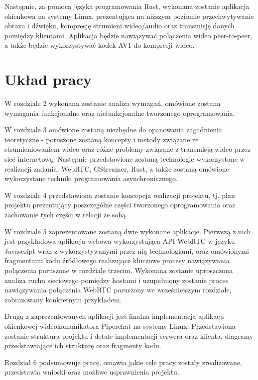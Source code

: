 Następnie, za pomocą języka programowania Rust, wykonana zostanie aplikacja okienkowa na systemy
Linux, prezentująca na niższym poziomie przechwytywanie obrazu i dźwięku, kompresję strumieni
wideo/audio oraz transmisję danych pomiędzy klientami. Aplikacja będzie nawiązywać połączenia wideo
peer-to-peer, a także będzie wykorzystywać kodek AV1 do kompresji wideo.

\section{Układ pracy}

W rozdziale 2 wykonana zostanie analiza wymagań, omówione zostaną wymagania funkcjonalne oraz
niefunkcjonalne tworzonego oprogramowania.

W rozdziale 3 omówione zostaną niezbędne do opanowania zagadnienia teoretyczne - poruszone zostaną
koncepty i metody związane ze strumieniowaniem wideo oraz różne problemy związane z transmisją wideo
przez sieć internetową.
Następnie przedstawione zostaną technologie wykorzystane w realizacji
zadania: WebRTC, GStreamer, Rust, a także zostaną omówione wykorzystane techniki programowania
asynchronicznego.

W rozdziale 4 przedstawiona zostanie koncepcja realizacji projektu, tj. plan projektu prezentujący
poszczególne części tworzonego oprogramowania oraz zachowanie tych części w relacji ze sobą.

W rozdziale 5 zaprezentowane zostaną dwie wykonane aplikacje. Pierwszą z nich jest przykładowa
aplikacja webowa wykorzystująca API WebRTC w języku Javascript wraz z wykorzystywanymi przez nią
technologiami, oraz omówionymi fragmentami kodu źródłowego realizujące kluczowe procesy nawiązywania
połączenia poruszone w rozdziale trzecim. Wykonana zostanie uproszczona analiza ruchu sieciowego
pomiędzy hostami i uzupełniony zostanie proces nawiązywania połączenia WebRTC poruszony we
wcześniejszym rozdziale, zobrazowany konkretnym przykładem.

Drugą z zaprezentowanych aplikacji jest finalna implementacja aplikacji okienkowej wideokomunikatora
Piperchat na systemy Linux. Przedstawiona zostanie struktura projektu i detale implementacji serwera
oraz klienta, diagramy przedstawiające ich strukturę oraz fragmenty kodu.

Rozdział 6 podsumowuje pracę, omawia jakie cele pracy zostały zrealizowane, przedstawia wnioski oraz
możliwe usprawnienia projektu.

